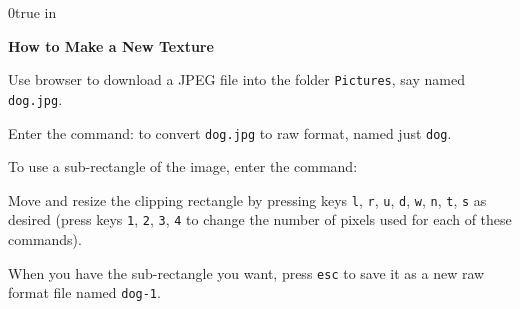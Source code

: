 \nopagenumbers
\parindent 0true in

{\bf How to Make a New Texture}
\medskip

Use browser to download a JPEG file into the folder {\tt Pictures}, say
named {\tt dog.jpg}.
\medskip

Enter the command:
\smallskip
{}
\smallskip
to convert {\tt dog.jpg} to raw format, named just {\tt dog}.
\medskip

To use a sub-rectangle of the image, enter the command:
\smallskip
{}
\smallskip

Move and resize the clipping rectangle by pressing keys
{\tt l}, {\tt r}, {\tt u}, {\tt d},
{\tt w}, {\tt n}, {\tt t}, {\tt s}
as desired (press keys {\tt 1}, {\tt 2}, {\tt 3}, {\tt 4} to
change the number of pixels used for each of these commands).
\medskip

When you have the sub-rectangle you want, press {\tt esc} to
save it as a new raw format file named {\tt dog-1}.

\vfil\eject
\bye

